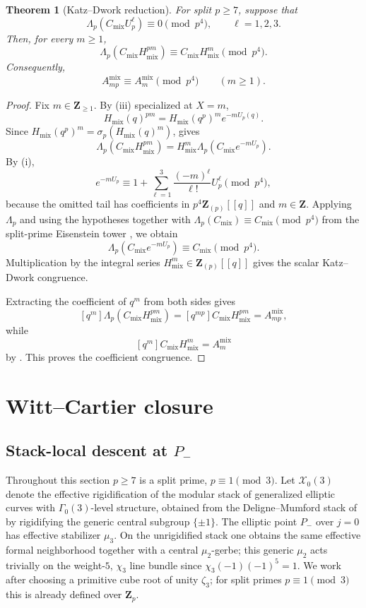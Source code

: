 \documentclass[11pt]{amsart}
\newtheorem{theorem}{Theorem}[section]
\theoremstyle{definition}
\theoremstyle{remark}
\newcommand{\Z}{\mathbf{Z}}
\begin{document}
\begin{theorem}[Katz--Dwork reduction]\label{thm:KD-input}
For split $p\ge 7$, suppose that
\[
\Lambda_p(C_{\mathrm{mix}}U_p^\ell)\equiv 0\pmod{p^4},\qquad \ell=1,2,3.
\]
Then, for every $m\ge 1$,
\[
\Lambda_p(C_{\mathrm{mix}}H_{\mathrm{mix}}^{pm})\equiv C_{\mathrm{mix}}H_{\mathrm{mix}}^m\pmod{p^4}.
\]
Consequently,
\[
A_{mp}^{\mathrm{mix}}\equiv A_m^{\mathrm{mix}}\pmod{p^4}\qquad(m\ge 1).
\]
\end{theorem}

\begin{proof}
Fix $m\in\Z_{\ge 1}$. By (iii) specialized at $X=m$,
\[
H_{\mathrm{mix}}(q)^{pm}=H_{\mathrm{mix}}(q^p)^m e^{-mU_p(q)}.
\]
Since $H_{\mathrm{mix}}(q^p)^m=\sigma_p(H_{\mathrm{mix}}(q)^m)$,  gives
\[
\Lambda_p(C_{\mathrm{mix}}H_{\mathrm{mix}}^{pm})
=H_{\mathrm{mix}}^m\Lambda_p(C_{\mathrm{mix}}e^{-mU_p}).
\]
By (i),
\[
e^{-mU_p}\equiv 1+\sum_{\ell=1}^3\frac{(-m)^\ell}{\ell!}U_p^\ell\pmod{p^4},
\]
because the omitted tail has coefficients in $p^4\Z_{(p)}[[q]]$ and $m\in\Z$. Applying $\Lambda_p$ and using the hypotheses together with
$\Lambda_p(C_{\mathrm{mix}})\equiv C_{\mathrm{mix}}\pmod{p^4}$ from the split-prime Eisenstein tower , we obtain
\[
\Lambda_p(C_{\mathrm{mix}}e^{-mU_p})\equiv C_{\mathrm{mix}}\pmod{p^4}.
\]
Multiplication by the integral series $H_{\mathrm{mix}}^m\in\Z_{(p)}[[q]]$ gives the scalar Katz--Dwork congruence.

Extracting the coefficient of $q^m$ from both sides gives
\[
[q^m]\Lambda_p(C_{\mathrm{mix}}H_{\mathrm{mix}}^{pm})
=[q^{mp}]C_{\mathrm{mix}}H_{\mathrm{mix}}^{pm}=A_{mp}^{\mathrm{mix}},
\]
while
\[
[q^m]C_{\mathrm{mix}}H_{\mathrm{mix}}^m=A_m^{\mathrm{mix}}
\]
by . This proves the coefficient congruence.
\end{proof}

\section{Witt--Cartier closure}\label{sec:WC}

\subsection{Stack-local descent at \texorpdfstring{$P_-$}{P-}}\label{subsec:stack-local-descent}\label{subsec:auxiliary-descent}

Throughout this section $p\ge 7$ is a split prime, $p\equiv 1\pmod 3$. Let $\mathcal X_0(3)$ denote the effective rigidification of the modular stack of generalized elliptic curves with $\Gamma_0(3)$-level structure, obtained from the Deligne--Mumford stack of \cite{DR} by rigidifying the generic central subgroup $\{\pm 1\}$. The elliptic point $P_-$ over $j=0$ has effective stabilizer $\mu_3$. On the unrigidified stack one obtains the same effective formal neighborhood together with a central $\mu_2$-gerbe; this generic $\mu_2$ acts trivially on the weight-$5$, $\chi_3$ line bundle since $\chi_3(-1)(-1)^5=1$. We work after choosing a primitive cube root of unity $\zeta_3$; for split primes $p\equiv 1\pmod 3$ this is already defined over $\Z_p$.
\end{document}
